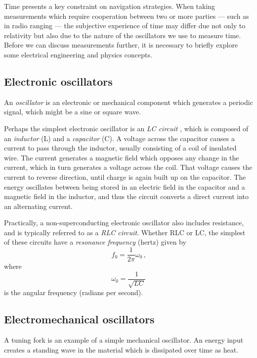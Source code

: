 \documentclass[12pt]{article}
\begin{document}
Time presents a key constraint on navigation strategies. When taking measurements which require cooperation between two or more parties --- such as in radio ranging --- the subjective experience of time may differ due not only to relativity but also due to the nature of the oscillators we use to measure time. Before we can discuss measurements further, it is necessary to briefly explore some electrical engineering and physics concepts.

\subsection{Electronic oscillators}
An \textit{oscillator} is an electronic or mechanical component which generates a periodic signal, which might be a sine or square wave.

Perhaps the simplest electronic oscillator is an \textit{LC circuit} \citep{Savary1827}, which is composed of an \textit{inductor} (L) and a \textit{capacitor} (C). A voltage across the capacitor causes a current to pass through the inductor, usually consisting of a coil of insulated wire. The current generates a magnetic field which opposes any change in the current, which in turn generates a voltage across the coil. That voltage causes the current to reverse direction, until charge is again built up on the capacitor. The energy oscillates between being stored in an electric field in the capacitor and a magnetic field in the inductor, and thus the circuit converts a direct current into an alternating current.

Practically, a non-superconducting electronic oscillator also includes resistance, and is typically referred to as a \textit{RLC circuit}. Whether RLC or LC, the simplest of these circuits have a \textit{resonance frequency} (hertz) given by
\begin{equation}
f_0 = \frac{1}{2\pi} \omega_0\,\text{,}
\end{equation}
where
\begin{equation}
\omega_0 = \frac{1}{\sqrt{LC}}
\end{equation}
is the angular frequency (radians per second).

\subsection{Electromechanical oscillators}
A tuning fork is an example of a simple mechanical oscillator. An energy input creates a standing wave in the material which is dissipated over time as heat.
\end{document}
